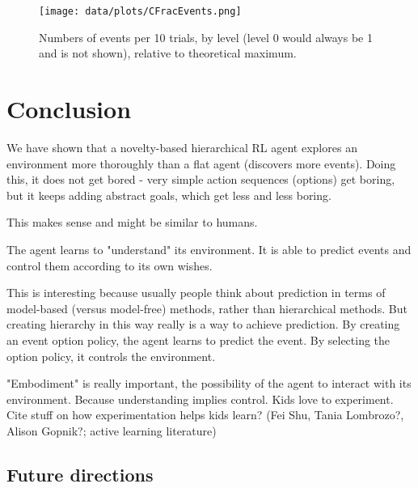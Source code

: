 \documentclass{article}
\begin{document}
\begin{figure}[h]
	\centering
	\texttt{[image: data/plots/CFracEvents.png]}
	\caption{Numbers of events per 10 trials, by level (level 0 would always be 1 and is not shown), relative to theoretical maximum.}
	\label{TaskFigure}
\end{figure}

\section{Conclusion}

We have shown that a novelty-based hierarchical RL agent explores an environment more thoroughly than a flat agent (discovers more events). Doing this, it does not get bored - very simple action sequences (options) get boring, but it keeps adding abstract goals, which get less and less boring. 

This makes sense and might be similar to humans.

The agent learns to "understand" its environment. It is able to predict events and control them according to its own wishes.

This is interesting because usually people think about prediction in terms of model-based (versus model-free) methods, rather than hierarchical methods. But creating hierarchy in this way really is a way to achieve prediction. By creating an event option policy, the agent learns to predict the event. By selecting the option policy, it controls the environment.

"Embodiment" is really important, the possibility of the agent to interact with its environment. Because understanding implies control. Kids love to experiment. Cite stuff on how experimentation helps kids learn? (Fei Shu, Tania Lombrozo?, Alison Gopnik?; active learning literature)

\subsection{Future directions}
\end{document}
